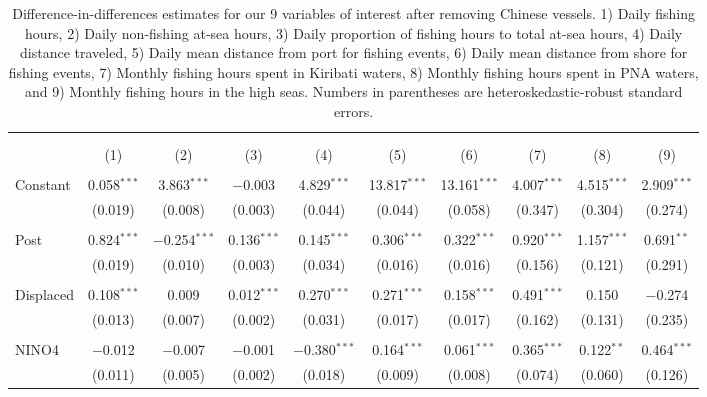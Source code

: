 
\begin{table}[H] \centering 
  \caption{\label{tab:DID_without_CHN}Difference-in-differences estimates for our 9 variables of interest after removing Chinese vessels. 1) Daily fishing hours, 2) Daily non-fishing at-sea hours, 3) Daily proportion of fishing hours to total at-sea hours, 4) Daily distance traveled, 5) Daily mean distance from port for fishing events, 6) Daily mean distance from shore for fishing events, 7) Monthly fishing hours spent in Kiribati waters, 8) Monthly fishing hours spent in PNA waters, and 9) Monthly fishing hours in the high seas. Numbers in parentheses are heteroskedastic-robust standard errors.} 
  \label{} 
\footnotesize 
\begin{tabular}{@{\extracolsep{1pt}}lccccccccc} 
\\[-1.8ex]\hline 
\hline \\[-1.8ex] 
\\[-1.8ex] & (1) & (2) & (3) & (4) & (5) & (6) & (7) & (8) & (9)\\ 
\hline \\[-1.8ex] 
 Constant & 0.058$^{***}$ & 3.863$^{***}$ & $-$0.003 & 4.829$^{***}$ & 13.817$^{***}$ & 13.161$^{***}$ & 4.007$^{***}$ & 4.515$^{***}$ & 2.909$^{***}$ \\ 
  & (0.019) & (0.008) & (0.003) & (0.044) & (0.044) & (0.058) & (0.347) & (0.304) & (0.274) \\ 
  & & & & & & & & & \\ 
 Post & 0.824$^{***}$ & $-$0.254$^{***}$ & 0.136$^{***}$ & 0.145$^{***}$ & 0.306$^{***}$ & 0.322$^{***}$ & 0.920$^{***}$ & 1.157$^{***}$ & 0.691$^{**}$ \\ 
  & (0.019) & (0.010) & (0.003) & (0.034) & (0.016) & (0.016) & (0.156) & (0.121) & (0.291) \\ 
  & & & & & & & & & \\ 
 Displaced & 0.108$^{***}$ & 0.009 & 0.012$^{***}$ & 0.270$^{***}$ & 0.271$^{***}$ & 0.158$^{***}$ & 0.491$^{***}$ & 0.150 & $-$0.274 \\ 
  & (0.013) & (0.007) & (0.002) & (0.031) & (0.017) & (0.017) & (0.162) & (0.131) & (0.235) \\ 
  & & & & & & & & & \\ 
 NINO4 & $-$0.012 & $-$0.007 & $-$0.001 & $-$0.380$^{***}$ & 0.164$^{***}$ & 0.061$^{***}$ & 0.365$^{***}$ & 0.122$^{**}$ & 0.464$^{***}$ \\ 
  & (0.011) & (0.005) & (0.002) & (0.018) & (0.009) & (0.008) & (0.074) & (0.060) & (0.126) \\ 

\end{tabular}
\end{table}
